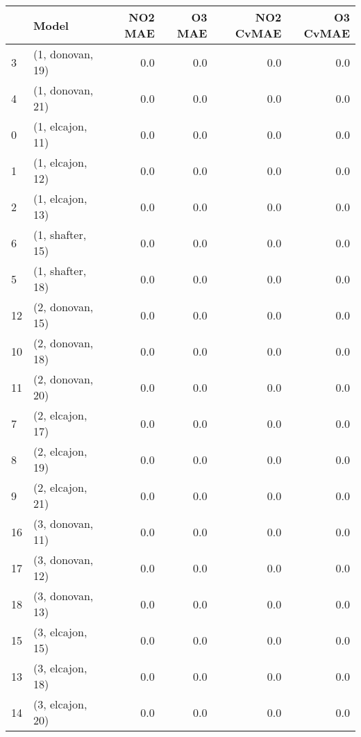 \begin{tabular}{llrrrr}
\toprule
{} &             Model &  NO2 MAE &  O3 MAE &  NO2 CvMAE &  O3 CvMAE \\
\midrule
3  &  (1, donovan, 19) &      0.0 &     0.0 &        0.0 &       0.0 \\
4  &  (1, donovan, 21) &      0.0 &     0.0 &        0.0 &       0.0 \\
0  &  (1, elcajon, 11) &      0.0 &     0.0 &        0.0 &       0.0 \\
1  &  (1, elcajon, 12) &      0.0 &     0.0 &        0.0 &       0.0 \\
2  &  (1, elcajon, 13) &      0.0 &     0.0 &        0.0 &       0.0 \\
6  &  (1, shafter, 15) &      0.0 &     0.0 &        0.0 &       0.0 \\
5  &  (1, shafter, 18) &      0.0 &     0.0 &        0.0 &       0.0 \\
12 &  (2, donovan, 15) &      0.0 &     0.0 &        0.0 &       0.0 \\
10 &  (2, donovan, 18) &      0.0 &     0.0 &        0.0 &       0.0 \\
11 &  (2, donovan, 20) &      0.0 &     0.0 &        0.0 &       0.0 \\
7  &  (2, elcajon, 17) &      0.0 &     0.0 &        0.0 &       0.0 \\
8  &  (2, elcajon, 19) &      0.0 &     0.0 &        0.0 &       0.0 \\
9  &  (2, elcajon, 21) &      0.0 &     0.0 &        0.0 &       0.0 \\
16 &  (3, donovan, 11) &      0.0 &     0.0 &        0.0 &       0.0 \\
17 &  (3, donovan, 12) &      0.0 &     0.0 &        0.0 &       0.0 \\
18 &  (3, donovan, 13) &      0.0 &     0.0 &        0.0 &       0.0 \\
15 &  (3, elcajon, 15) &      0.0 &     0.0 &        0.0 &       0.0 \\
13 &  (3, elcajon, 18) &      0.0 &     0.0 &        0.0 &       0.0 \\
14 &  (3, elcajon, 20) &      0.0 &     0.0 &        0.0 &       0.0 \\
\bottomrule
\end{tabular}
